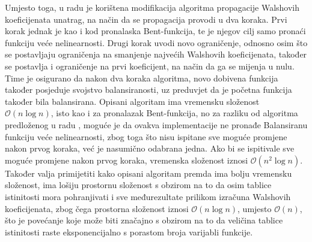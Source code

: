 Umjesto toga, u radu je korištena modifikacija algoritma propagacije Walshovih koeficijenata unatrag, na način da se propagacija provodi u dva koraka.
Prvi korak jednak je kao i kod pronalaska Bent-funkcija, te je njegov cilj samo pronaći funkciju veće nelinearnosti.
Drugi korak uvodi novo ograničenje, odnosno osim što se postavljaju ograničenja na smanjenje najvećih Walshovih koeficijenata, također se postavlja i ograničenje na prvi koeficijent, na način da ga se mijenja u nulu.
Time je osigurano da nakon dva koraka algoritma, novo dobivena funkcija također posjeduje svojstvo balansiranosti, uz preduvjet da je početna funkcija također bila balansirana.
Opisani algoritam ima vremensku složenost $\mathcal{O}(n \log n)$, isto kao i za pronalazak Bent-funkcija, no za razliku od algoritma predloženog u radu \cite{millan1997smart}, moguće je da ovakva implementacije ne pronađe Balansiranu funkciju veće nelinearnosti, zbog toga što nisu ispitane sve moguće promjene nakon prvog koraka, već je nasumično odabrana jedna.
Ako bi se ispitivale sve moguće promjene nakon prvog koraka, vremenska složenost iznosi $\mathcal{O}(n^2 \log n)$.
Također valja primijetiti kako opisani algoritam premda ima bolju vremensku složenost, ima lošiju prostornu složenost s obzirom na to da osim tablice istinitosti mora pohranjivati i sve međurezultate prilikom izračuna Walshovih koeficijenata, zbog čega prostorna složenost iznosi $\mathcal{O}(n \log n)$, umjesto $\mathcal{O}(n)$, što je povećanje koje može biti značajno s obzirom na to da veličina tablice istinitosti raste eksponencijalno s porastom broja varijabli funkcije.
